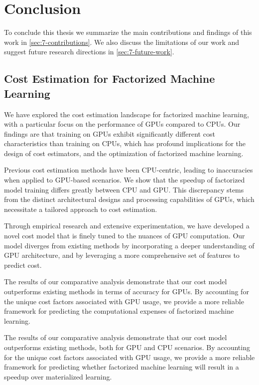 
\chapter{Conclusion}

\label{chapter:conclusion}
To conclude this thesis we summarize the main contributions and findings of this work in \autoref{sec:7-contributions}. We also discuss the limitations of our work and suggest future research directions in \autoref{sec:7-future-work}.

\section{Cost Estimation for Factorized Machine Learning}
\label{sec:7-contributions}
We have explored the cost estimation landscape for factorized machine learning, with a particular focus on the performance of GPUs compared to CPUs. Our findings are that training on GPUs exhibit significantly different cost characteristics than training on CPUs, which has profound implications for the design of cost estimators, and the optimization of factorized machine learning.

Previous cost estimation methods have been CPU-centric, leading to inaccuracies when applied to GPU-based scenarios. We show that the speedup of factorized model training differs greatly between CPU and GPU. This discrepancy stems from the distinct architectural designs and processing capabilities of GPUs, which necessitate a tailored approach to cost estimation.

Through empirical research and extensive experimentation, we have developed a novel cost model that is finely tuned to the nuances of GPU computation. Our model diverges from existing methods by incorporating a deeper understanding of GPU architecture, and by leveraging a more comprehensive set of features to predict cost.

The results of our comparative analysis demonstrate that our cost model outperforms existing methods in terms of accuracy for GPUs. By accounting for the unique cost factors associated with GPU usage, we provide a more reliable framework for predicting the computational expenses of factorized machine learning.

The results of our comparative analysis demonstrate that our cost model outperforms existing methods, both for GPU and CPU scenarios. By accounting for the unique cost factors associated with GPU usage, we provide a more reliable framework for predicting whether factorized machine learning will result in a speedup over materialized learning.

